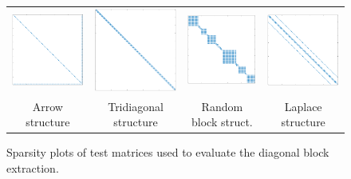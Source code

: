 \begin{figure}
\begin{center}
{\scriptsize
\begin{tabular}{cccc}
\includegraphics[width=.2\columnwidth]{plots/arr.png}
&
\includegraphics[width=.2\columnwidth]{plots/tdg.png}
&
\includegraphics[width=.2\columnwidth]{plots/rnd.png}
&
\includegraphics[width=.2\columnwidth]{plots/lap.png} \\
Arrow structure & Tridiagonal structure & Random block struct. & Laplace structure
\end{tabular}
}
\end{center}
\caption{%
Sparsity plots of test matrices used to evaluate the diagonal block extraction.%
}
\label{2017-gje-block-jacobi:fig:sparsityplots}
\end{figure}


